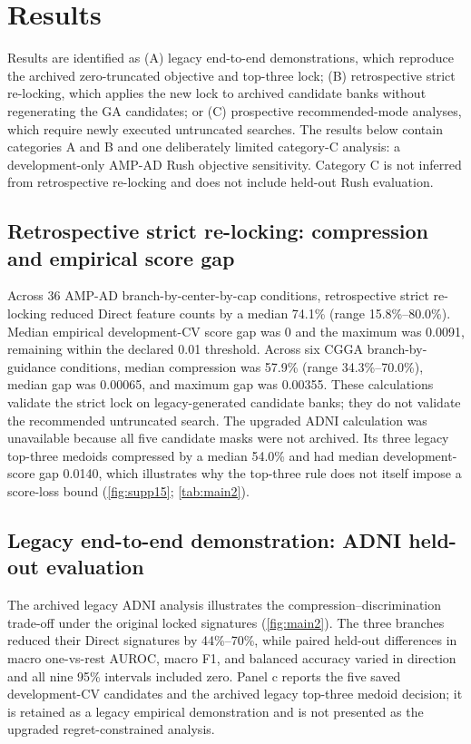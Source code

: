 \FloatBarrier
\section{Results}

Results are identified as (A) legacy end-to-end demonstrations, which reproduce the archived zero-truncated objective and top-three lock; (B) retrospective strict re-locking, which applies the new lock to archived candidate banks without regenerating the GA candidates; or (C) prospective recommended-mode analyses, which require newly executed untruncated searches. The results below contain categories A and B and one deliberately limited category-C analysis: a development-only AMP-AD Rush objective sensitivity. Category C is not inferred from retrospective re-locking and does not include held-out Rush evaluation.

\subsection{Retrospective strict re-locking: compression and empirical score gap}

Across 36 AMP-AD branch-by-center-by-cap conditions, retrospective strict re-locking reduced Direct feature counts by a median 74.1\% (range 15.8\%--80.0\%). Median empirical development-CV score gap was 0 and the maximum was 0.0091, remaining within the declared 0.01 threshold. Across six CGGA branch-by-guidance conditions, median compression was 57.9\% (range 34.3\%--70.0\%), median gap was 0.00065, and maximum gap was 0.00355. These calculations validate the strict lock on legacy-generated candidate banks; they do not validate the recommended untruncated search. The upgraded ADNI calculation was unavailable because all five candidate masks were not archived. Its three legacy top-three medoids compressed by a median 54.0\% and had median development-score gap 0.0140, which illustrates why the top-three rule does not itself impose a score-loss bound (\cref{fig:supp15}; \cref{tab:main2}).



\subsection{Legacy end-to-end demonstration: ADNI held-out evaluation}

The archived legacy ADNI analysis illustrates the compression--discrimination trade-off under the original locked signatures (\cref{fig:main2}). The three branches reduced their Direct signatures by 44\%--70\%, while paired held-out differences in macro one-vs-rest AUROC, macro F1, and balanced accuracy varied in direction and all nine 95\% intervals included zero. Panel c reports the five saved development-CV candidates and the archived legacy top-three medoid decision; it is retained as a legacy empirical demonstration and is not presented as the upgraded regret-constrained analysis.

